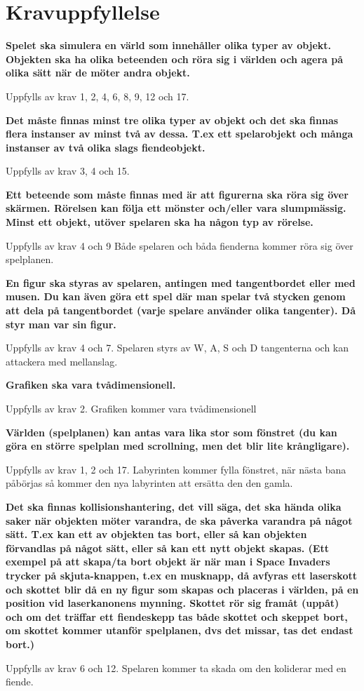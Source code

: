\documentclass{TDP005mall}
\begin{document}
\newpage
\section{Kravuppfyllelse}


\textbf{Spelet ska simulera en värld som innehåller olika typer av objekt. Objekten ska ha olika beteenden och röra sig i världen och agera på olika sätt när de möter andra objekt.}

Uppfylls av krav 1, 2, 4, 6, 8, 9, 12 och 17.

\textbf{Det måste finnas minst tre olika typer av objekt och det ska finnas flera instanser av minst två av dessa. T.ex ett spelarobjekt och många instanser av två olika slags fiendeobjekt.}

Uppfylls av krav 3, 4 och 15.

\textbf{Ett beteende som måste finnas med är att figurerna ska röra sig över skärmen. Rörelsen kan följa ett mönster och/eller vara slumpmässig. Minst ett objekt, utöver spelaren ska ha någon typ av rörelse.}

Uppfylls av krav 4 och 9
Både spelaren och båda fienderna kommer röra sig över spelplanen.

\textbf{En figur ska styras av spelaren, antingen med tangentbordet eller med musen. Du kan även göra ett spel där man spelar två stycken genom att dela på tangentbordet (varje spelare använder olika tangenter). Då styr man var sin figur.}

Uppfylls av krav 4 och 7. 
Spelaren styrs av W, A, S och D tangenterna och kan attackera med mellanslag.

\textbf{Grafiken ska vara tvådimensionell.}

Uppfylls av krav 2.
Grafiken kommer vara tvådimensionell 

\textbf{Världen (spelplanen) kan antas vara lika stor som fönstret (du kan göra en större spelplan med scrollning, men det blir lite krångligare).}

Uppfylls av krav 1, 2 och 17.
Labyrinten kommer fylla fönstret, när nästa bana påbörjas så kommer den nya labyrinten att ersätta den den gamla.

\textbf{Det ska finnas kollisionshantering, det vill säga, det ska hända olika saker när objekten möter varandra, de ska påverka varandra på något sätt. T.ex kan ett av objekten tas bort, eller så kan objekten förvandlas på något sätt, eller så kan ett nytt objekt skapas. (Ett exempel på att skapa/ta bort objekt är när man i Space Invaders trycker på skjuta-knappen, t.ex en musknapp, då avfyras ett laserskott och skottet blir då en ny figur som skapas och placeras i världen, på en position vid laserkanonens mynning. Skottet rör sig framåt (uppåt) och om det träffar ett fiendeskepp tas både skottet och skeppet bort, om skottet kommer utanför spelplanen, dvs det missar, tas det endast bort.)}

Uppfylls av krav 6 och 12. 
Spelaren kommer ta skada om den koliderar med en fiende.
\end{document}
